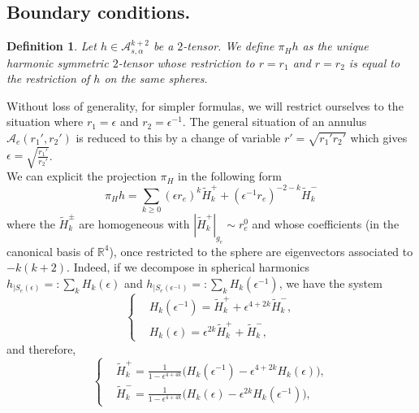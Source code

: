 \documentclass[12pt]{article}
\newtheorem{defn}[thm]{Definition}
\newcommand{\calA}{{\mathcal A}}
\begin{document}
    \subsection{Boundary conditions.}
    \begin{defn}
        Let $h\in \calA^{k+2}_{s,\alpha}$ be a $2$-tensor. We define
        $\pi_Hh$ as the unique harmonic symmetric $2$-tensor whose restriction to $ r= r_1 $ and $r=r_2$ is equal to the restriction of $h$ on the same spheres.
    \end{defn}
    
    Without loss of generality, for simpler formulas, we will restrict ourselves to the situation where $r_1 = \epsilon$ and $r_2 = \epsilon^{-1}$. The general situation of an annulus $\calA_e(r_1',r_2')$ is reduced to this by a change of variable $r' = \sqrt{r_1'r_2'}$ which gives $ \epsilon = \sqrt{\frac{r_1'}{r_2'}} $.
    \\
    
    We can explicit the projection $\pi_H$ in the following form 
    \begin{equation}
        \pi_Hh = \sum_{k\geqslant 0}(\epsilon r_e)^k \tilde{H}_{k}^+    + (\epsilon^{-1} r_e)^{-2-k} \tilde{H}_{k}^-\label{projection harmonic annulus}
    \end{equation}
    where the $\tilde{H}_{k}^\pm$ are homogeneous with $|\tilde{H}_{k}^+|_{g_e} \sim r_e^0$ and whose coefficients (in the canonical basis of $\mathbb{R}^4$), once restricted to the sphere are eigenvectors associated to $-k(k+2)$. Indeed, if we decompose in spherical harmonics $ h_{|S_e(\epsilon)} =: \sum_{k} H_{k}(\epsilon)$ and $ h_{|S_e(\epsilon^{-1})} =: \sum_{k} H_{k}(\epsilon^{-1})$, we have the system
    \begin{equation}
  \left\{
      \begin{aligned}
        &H_{k}(\epsilon^{-1}) = \tilde{H}_{k}^+ + \epsilon^{4+2k} \tilde{H}_{k}^-, \\
        &H_{k}(\epsilon) = \epsilon^{2k}\tilde{H}_{k}^+ + \tilde{H}_{k}^-,
      \end{aligned}
    \right.\label{dvp h}
\end{equation}
and therefore,
\begin{equation}
  \left\{
      \begin{aligned}
        &\tilde{H}_{k}^+ = \frac{1}{1-\epsilon^{4+4k}}\big(H_{k}(\epsilon^{-1}) -\epsilon^{4+2k}H_{k}(\epsilon) \big), \\
        &\tilde{H}_{k}^- = \frac{1}{1-\epsilon^{4+4k}}\big(H_{k}(\epsilon) - \epsilon^{2k} H_{k}(\epsilon^{-1})\big),
      \end{aligned}
    \right.\label{système}
\end{equation}
    
\end{document}
